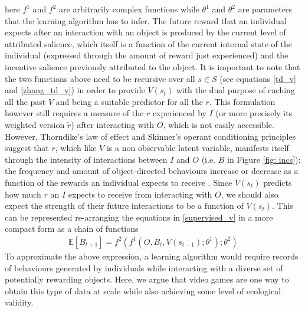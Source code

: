 here $f^{1}$ and $f^{2}$ are arbitrarily complex functions while $\theta^{1}$ and $\theta^{2}$ are parameters that the learning algorithm has to infer. The future reward that an individual expects after an interaction with an object is produced by the current level of attributed salience, which  itself is a function of the current internal state of the individual (expressed through the amount of reward just experienced) and the incentive salience previously attributed to the object. It is important to note that the two functions above need to be recursive over all $s \in S$ (see equations \ref{td_v} and \ref{zhang_td_v}) in order to provide $V(s_{t})$ with the dual purpose of caching all the past $V$ and being a suitable predictor for all the $r$. This formulation however still requires a measure of the $r$ experienced by $I$ (or more precisely its weighted version $\tilde{r}$) after interacting with $O$, which is not easily accessible. However, Thorndike's law of effect \cite{thorndike1927law} and Skinner's operant conditioning principles \cite{skinner1965science} suggest that $r$, which  like $V$ is a non observable latent variable, manifests itself through the intensity of interactions between $I$ and $O$ (i.e. $B$ in Figure \ref{fig: incs}): the frequency and amount of object-directed behaviours increase or decrease as a function of the rewards an individual expects to receive \cite{berridge2004motivation,schultz2017reward}. Since $V(s_{t})$ predicts how much $r$ an $I$ expects to receive from interacting with $O$, we should also expect the strength of their future interactions to be a function of $V(s_{t})$. This can be represented re-arranging the equations in \ref{supervised_v} in a more compact form as a chain of functions
\begin{align}
\label{supervised_b}
    \mathbb{E}[B_{t+1}] = f^{2}(f^{1}(O, B_{t}, V(s_{t-1}); \theta^{1});  \theta^{2})
\end{align}
To approximate the above expression, a learning algorithm would require records of behaviours generated by individuals while interacting with a diverse set of potentially rewarding objects. Here, we argue that video games are one way to obtain this type of data at scale while also achieving some level of ecological validity.

